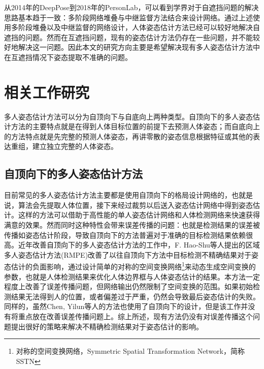 从2014年的DeepPose\cite{toshev2014deeppose}到2018年的PersonLab\cite{Papandreou2018PersonLab}，可以看到学界对于自遮挡问题的解决思路基本趋于一致：多阶段网络堆叠与中继监督方法结合来设计网络。通过上述使用多阶段堆叠以及中继监督的网络设计，人体姿态估计方法已经可以较好地解决自遮挡的问题。然而在互遮挡问题，现有的姿态估计方法仍存在一些问题，并不能较好地解决这一问题。因此本文的研究方向主要是希望解决现有多人姿态估计方法中在互遮挡情况下姿态提取不准确的问题。

\section{相关工作研究}
\label{sec:related_work}
多人姿态估计方法可以分为自顶向下与自底向上两种类型。自顶向下的多人姿态估计方法的主要特点就是在得到人体目标位置的前提下去预测人体姿态；而自底向上的方法特点就是先完整的预测人体姿态，再讲零散的姿态信息根据特征或其他的表达重组，建立独立完整的人体姿态。

\subsection{自顶向下的多人姿态估计方法}
\label{subsec:topdown}
目前常见的多人姿态估计方法主要都是使用自顶向下的格局设计网络的，也就是说，算法会先提取人体位置，接下来经过裁剪以后送入姿态估计网络中得到姿态估计。这样的方法可以借助于高性能的单人姿态估计网络和人体检测网络来快速获得满意的效果。然而同时这种特性会带来误差传播的问题：也就是检测结果的误差被传播如姿态估计阶段，导致自顶向下的方法普遍对于准确的目标检测结果依赖很高。近年改善自顶向下的多人姿态估计方法的工作中，F. Hao-Shu\cite{fang2017rmpe}等人提出的区域多人姿态估计方法(RMPE)改善了以往自顶向下方法中目标检测不精确结果对于姿态估计的负面影响，通过设计简单的对称的空间变换网络\footnote{对称的空间变换网络，Symmetric Spatial Transformation Network，简称SSTN}来动态生成空间变换的参数，也就是人体检测结果来优化人体边界框与人体姿态估计的结果。本方法一定程度上改善了误差传播问题，但网络输出仍然限制了空间变换的范围。如果初始检测结果无法得到人的位置，或者偏差过于严重，仍然会导致最后姿态估计的失败。同样的，虽然Chen, Yilun等人的方法\cite{Chen2017Cascaded}也使用了自顶向下的设计，但是该工作并没有将重点放在改善误差传播问题上。综上所述，现有方法仍没有对误差传播这个问题提出很好的策略来解决不精确检测结果对于姿态估计的影响。

